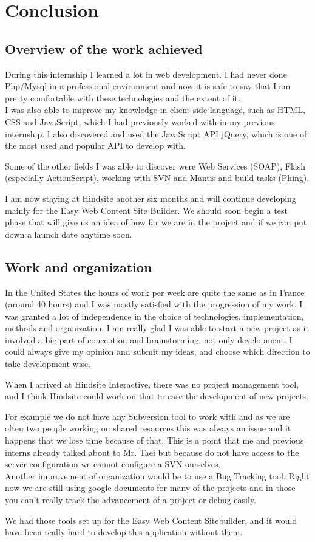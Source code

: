 \chapter*{Conclusion}

\section*{Overview of the work achieved}

During this internship I learned a lot in web development. I had never done 
Php/Mysql in a professional environment and now it is safe to say that I am pretty 
comfortable with these technologies and the extent of it.
\\I was also able to improve my knowledge in client side language, such as HTML, CSS and 
JavaScript, which I had previously worked with in my previous internship. I also discovered 
and used the JavaScript API jQuery, which is one of the most used and popular API to develop with.

Some of the other fields I was able to discover were Web Services (SOAP), Flash (especially ActionScript), 
working with SVN and Mantis and build tasks (Phing).

I am now staying at Hindsite another six months and will continue developing mainly for the Easy 
Web Content Site Builder. We should soon begin a test phase that will give us an idea of how far 
we are in the project and if we can put down a launch date anytime soon.

\section*{Work and organization}

In the United States the hours of work per week are quite the same as in France (around
40 hours) and I was mostly satisfied with the progression of my work.
I was granted a lot of independence in the choice of technologies, implementation,
methods and organization. I am really glad I was able to start a new project as it involved 
a big part of conception and brainstorming, not only development. I could always give my opinion and submit my ideas, and 
choose which direction to take development-wise.

When I arrived at Hindsite Interactive, there was no project management tool, and I think Hindsite could work on that
to ease the development of new projects. 

For example we do not have any Subversion tool to work with and as we are often 
two people working on shared resources this was always an issue and 
it happens that we lose time because of that.
This is a point that me and previous interns already talked about to Mr. Taei but
because do not have access to the server configuration we cannot configure a SVN
ourselves.
\\Another improvement of organization would be to use a Bug Tracking tool. Right now we are still
using google documents for many of the projects and in those you can't really track the advancement of a project or debug easily.

We had those tools set up for the Easy Web Content Sitebuilder, 
and it would have been really hard to develop this application without them.